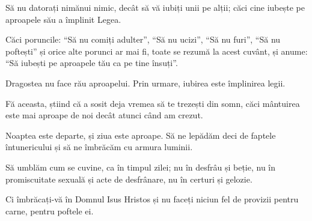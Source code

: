 {\par }{\PP {}Să nu datorați nimănui nimic, decât să vă iubiți unii pe alții; căci cine iubește pe aproapele său a împlinit Legea.

Căci poruncile: “Să nu comiți adulter”, “Să nu ucizi”, “Să nu furi”, “Să nu poftești” și orice alte porunci ar mai fi, toate se rezumă la acest cuvânt, și anume: “Să iubești pe aproapele tău ca pe tine însuți”.

Dragostea nu face rău aproapelui. Prin urmare, iubirea este împlinirea legii.


\par }{\PP {}Fă aceasta, știind că a sosit deja vremea să te trezești din somn, căci mântuirea este mai aproape de noi decât atunci când am crezut.

Noaptea este departe, și ziua este aproape. Să ne lepădăm deci de faptele întunericului și să ne îmbrăcăm cu armura luminii.

Să umblăm cum se cuvine, ca în timpul zilei; nu în desfrâu și beție, nu în promiscuitate sexuală și acte de desfrânare, nu în certuri și gelozie.

Ci îmbrăcați-vă în Domnul Isus Hristos și nu faceți niciun fel de provizii pentru carne, pentru poftele ei.



\par }
